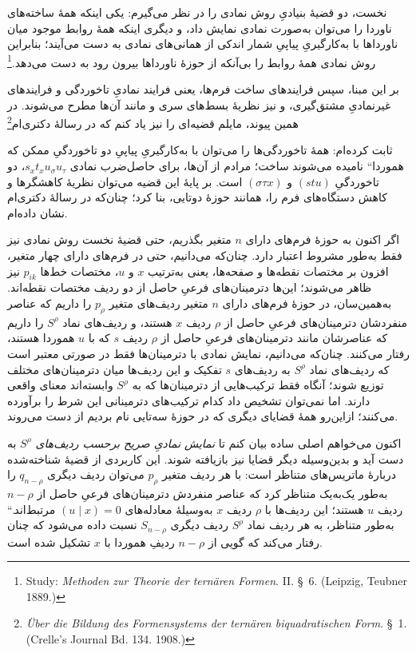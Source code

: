 \documentclass[11pt]{article}
\providecommand{\glqq}{\textquotedblbase}
\providecommand{\grqq}{\textquotedblleft}
\newcommand{\srcLTR}[1]{\relax\ifmmode\text{\mbox{\babelsublr{\foreignlanguage{english}{#1}}}}\else\babelsublr{\foreignlanguage{english}{#1}}\fi}
\newcommand{\srcfn}[2]{\begingroup\renewcommand{\thefootnote}{\srcLTR{#1}}\footnote{#2}\addtocounter{footnote}{-1}\endgroup}
\begin{document}
نخست، دو قضیهٔ بنیادیِ روش نمادی را در نظر می‌گیرم: یکی اینکه همهٔ ساخته‌های ناوردا را می‌توان به‌صورت نمادی نمایش داد، و دیگری اینکه همهٔ روابط موجود میان ناورداها با به‌کارگیریِ پیاپیِ شمار اندکی از همانی‌های نمادی به دست می‌آیند؛ بنابراین روش نمادی همهٔ روابط را بی‌آنکه از حوزهٔ ناورداها بیرون رود به دست می‌دهد.\srcfn{1)}{Study: \emph{Methoden zur Theorie der ternären Formen}. II. \S\ 6. (Leipzig, Teubner 1889.)} بر این مبنا، سپس فرایندهای ساخت فرم‌ها، یعنی فرایند نمادیِ تاخوردگی و فرایندهای غیرنمادیِ مشتق‌گیری، و نیز نظریهٔ بسط‌های سری و مانند آن‌ها مطرح می‌شوند. در همین پیوند، مایلم قضیه‌ای را نیز یاد کنم که در رسالهٔ دکتری‌ام\srcfn{2)}{\emph{Über die Bildung des Formensystems der ternären biquadratischen Form}. \S\ 1. (Crelle's Journal Bd. 134. 1908.)} ثابت کرده‌ام: همهٔ تاخوردگی‌ها را می‌توان با به‌کارگیریِ پیاپیِ دو تاخوردگیِ ممکن که \glqq{}هموردا\grqq{} نامیده می‌شوند ساخت؛ مرادم از آن‌ها، برای حاصل‌ضرب نمادی $s_x t_x u_\sigma u_\tau$، دو تاخوردگیِ $(stu)$ و $(\sigma\tau x)$ است. بر پایهٔ این قضیه می‌توان نظریهٔ کاهشگرها و کاهش دستگاه‌های فرم را، همانند حوزهٔ دوتایی، بنا کرد؛ چنان‌که در رسالهٔ دکتری‌ام نشان داده‌ام.

اگر اکنون به حوزهٔ فرم‌های دارای $n$ متغیر بگذریم، حتی قضیهٔ نخست روش نمادی نیز فقط به‌طور مشروط اعتبار دارد. چنان‌که می‌دانیم، حتی در فرم‌های دارای چهار متغیر، افزون بر مختصات نقطه‌ها و صفحه‌ها، یعنی به‌ترتیب $x$ و $u$، مختصات خط‌ها $p_{ik}$ نیز ظاهر می‌شوند؛ این‌ها دترمینان‌های فرعیِ حاصل از دو ردیف مختصات نقطه‌اند. به‌همین‌سان، در حوزهٔ فرم‌های دارای $n$ متغیر ردیف‌های متغیر $p_\rho$ را داریم که عناصر منفردشان دترمینان‌های فرعیِ حاصل از $\rho$ ردیف $x$ هستند، و ردیف‌های نماد $S^\rho$ را داریم که عناصرشان مانند دترمینان‌های فرعیِ حاصل از $\rho$ ردیف $s$ که با $u$ هموردا هستند، رفتار می‌کنند. چنان‌که می‌دانیم، نمایش نمادی با دترمینان‌ها فقط در صورتی معتبر است که ردیف‌های نماد $S^\rho$ به ردیف‌های $s$ تفکیک و این ردیف‌ها میان دترمینان‌های مختلف توزیع شوند؛ آنگاه فقط ترکیب‌هایی از دترمینان‌ها که به $S^\rho$ وابسته‌اند معنای واقعی دارند. اما نمی‌توان تشخیص داد کدام ترکیب‌های دترمینانی این شرط را برآورده می‌کنند؛ ازاین‌رو همهٔ قضایای دیگری که در حوزهٔ سه‌تایی نام بردیم از دست می‌روند.

اکنون می‌خواهم اصلی ساده بیان کنم تا \emph{نمایش نمادیِ صریح برحسب ردیف‌های $S^\rho$} به دست آید و بدین‌وسیله دیگر قضایا نیز بازیافته شوند. این کاربردی از قضیهٔ شناخته‌شده دربارهٔ ماتریس‌های متناظر است: \glqq{}با هر ردیف متغیر $p_\rho$ می‌توان ردیف دیگری $q_{n-\rho}$ را به‌طور یک‌به‌یک متناظر کرد که عناصر منفردش دترمینان‌های فرعیِ حاصل از $n-\rho$ ردیف $u$ هستند؛ این ردیف‌ها با $\rho$ ردیف $x$ به‌وسیلهٔ معادله‌های $(u\mid x)=0$ مرتبط‌اند.\grqq{} به‌طور متناظر، به هر ردیف نماد $S^\rho$ ردیف دیگری $S_{n-\rho}$ نسبت داده می‌شود که چنان رفتار می‌کند که گویی از $n-\rho$ ردیفِ هموردا با $x$ تشکیل شده است.
\end{document}
